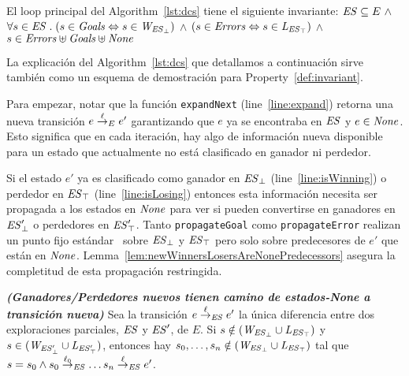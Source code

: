 \begin{property}[Invariante]
\label{def:invariant}
El loop principal del Algorithm~\ref{lst:dcs} tiene el siguiente invariante: 
$\mathit{ES} \subseteq E \ \wedge $ $\forall s \in \mathit{ES} \;.\; (s\in\mathit{Goals} 
\Leftrightarrow 
s \in 
\mathit{W_{\mathit{\mathit{ES}_{\bot}}}})$ $\wedge$  $(s\in\mathit{Errors} 
\Leftrightarrow s \in \mathit{L_{\mathit{\mathit{ES}_{\top}}}})$ $\wedge$  
$s\in\mathit{Errors}\uplus\mathit{Goals}\uplus\mathit{None}$

\end{property}

La explicación del Algorithm~\ref{lst:dcs} que detallamos a continuación sirve también como un esquema de demostración para Property~\ref{def:invariant}.   

Para empezar, notar que la función \texttt{expandNext} 
(line~\ref{line:expand}) retorna una nueva transición $e \overset{\ell}{\rightarrow}_{E} e'$ 
garantizando que $e$ ya se encontraba en $\mathit{ES}$ y $e \in \mathit{None}$. 
Esto significa que en cada iteración, hay algo de información nueva disponible para un estado que actualmente no está clasificado en ganador ni perdedor.

Si el estado $e'$ ya es clasificado como ganador en
$\mathit{\mathit{ES}_{\bot}}$ (line~\ref{line:isWinning}) o
perdedor en $\mathit{\mathit{ES}_{\top}}$ (line~\ref{line:isLosing}) 
entonces esta información necesita ser propagada a los estados en $\mathit{None}$ para ver si pueden convertirse en ganadores en 
$\mathit{\mathit{ES}'_{\bot}}$ o perdedores en
$\mathit{\mathit{ES}'_{\top}}$. Tanto \texttt{propagateGoal} como
\texttt{propagateError} realizan un punto fijo estándar~\cite{Ramadge:1989:CDES} sobre
$\mathit{\mathit{ES}_{\bot}}$ y
$\mathit{\mathit{ES}_{\top}}$ pero solo sobre predecesores de $e'$ que están en $\mathit{None}$. 
Lemma~\ref{lem:newWinnersLosersAreNonePredecessors} asegura la completitud de esta propagación restringida.

\begin{lemma}\textbf{\emph{(Ganadores/Perdedores nuevos tienen camino de estados-\textit{None} a transición nueva)}}
\label{lem:newWinnersLosersAreNonePredecessors}
Sea la transición $e \overset{\ell}{\rightarrow}_{\mathit{ES}} e'$ la única diferencia entre dos exploraciones parciales, $\mathit{ES}$ y $\mathit{ES}'$, de $E$. Si $s \notin (\mathit{W_{\mathit{\mathit{ES}_{\bot}}}} \cup \mathit{L_{\mathit{\mathit{ES}_{\top}}}})$ y $s \in (\mathit{W_{\mathit{\mathit{ES}'_{\bot}}}} \cup \mathit{L_{\mathit{\mathit{ES}'_{\top}}}})$, entonces hay $s_0, \ldots, s_n \notin (\mathit{W_{\mathit{\mathit{ES}_{\bot}}}} \cup \mathit{L_{\mathit{\mathit{ES}_{\top}}}})$ tal que $s = s_0 \wedge
s_0 \overset{\ell_0}{\rightarrow}_{\mathit{ES}}\ldots s_{n} \overset{\ell}{\rightarrow}_{\mathit{ES}} e'$.
\end{lemma}

